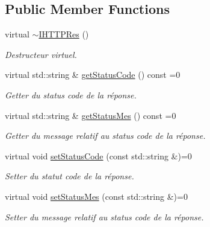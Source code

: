 \subsection*{Public Member Functions}
\begin{DoxyCompactItemize}
\item 
\hypertarget{class_a_p_i_tree_friends_1_1_i_h_t_t_p_res_ac3349bcdf8300a8c830afd13a3899b6e}{}virtual \hyperlink{class_a_p_i_tree_friends_1_1_i_h_t_t_p_res_ac3349bcdf8300a8c830afd13a3899b6e}{$\sim$\+I\+H\+T\+T\+P\+Res} ()\label{class_a_p_i_tree_friends_1_1_i_h_t_t_p_res_ac3349bcdf8300a8c830afd13a3899b6e}

\begin{DoxyCompactList}\small\item\em Destructeur virtuel. \end{DoxyCompactList}\item 
virtual std\+::string \& \hyperlink{class_a_p_i_tree_friends_1_1_i_h_t_t_p_res_a5c75c19aa74c72145abc7dd38cc704fc}{get\+Status\+Code} () const =0
\begin{DoxyCompactList}\small\item\em Getter du status code de la réponse. \end{DoxyCompactList}\item 
virtual std\+::string \& \hyperlink{class_a_p_i_tree_friends_1_1_i_h_t_t_p_res_ae8c1349ea94fe0e11fcd1043ea9edd20}{get\+Status\+Mes} () const =0
\begin{DoxyCompactList}\small\item\em Getter du message relatif au status code de la réponse. \end{DoxyCompactList}\item 
virtual void \hyperlink{class_a_p_i_tree_friends_1_1_i_h_t_t_p_res_a3b8c6c14c3f73b876b6d9bba2c3a4bf3}{set\+Status\+Code} (const std\+::string \&)=0
\begin{DoxyCompactList}\small\item\em Setter du statut code de la réponse. \end{DoxyCompactList}\item 
virtual void \hyperlink{class_a_p_i_tree_friends_1_1_i_h_t_t_p_res_a0ab777c5ba083bc41c0c6d256f5a1054}{set\+Status\+Mes} (const std\+::string \&)=0
\begin{DoxyCompactList}\small\item\em Setter du message relatif au status code de la réponse. \end{DoxyCompactList}\end{DoxyCompactItemize}


